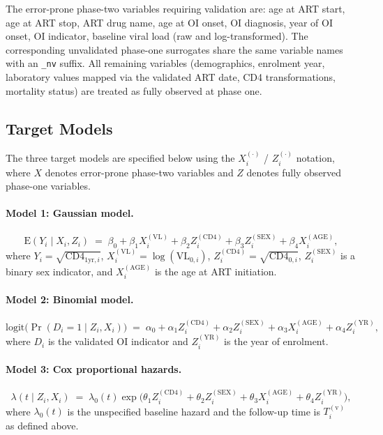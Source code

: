 The error-prone phase-two variables requiring validation are: age at ART start, age at ART stop, ART drug name, age at OI onset, OI diagnosis, year of OI onset, OI indicator, baseline viral load (raw and log-transformed). The corresponding unvalidated phase-one surrogates share the same variable names with an \texttt{\_nv} suffix. All remaining variables (demographics, enrolment year, laboratory values mapped via the validated ART date, CD4 transformations, mortality status) are treated as fully observed at phase one.

\subsection{Target Models}
\label{app:vccc_models}

The three target models are specified below using the $X_i^{(\cdot)}$ / $Z_i^{(\cdot)}$ notation, where $X$ denotes error-prone phase-two variables and $Z$ denotes fully observed phase-one variables.

\paragraph{Model 1: Gaussian model.}
\begin{equation}
    \mathrm{E}(Y_i \mid X_i, Z_i) \;=\;
    \beta_0
    + \beta_1 X_i^{(\mathrm{VL})}
    + \beta_2 Z_i^{(\mathrm{CD4})}
    + \beta_3 Z_i^{(\mathrm{SEX})}
    + \beta_4 X_i^{(\mathrm{AGE})},
    \label{eq:app_vccc_gauss}
\end{equation}
where $Y_i = \sqrt{\mathrm{CD4}_{1\mathrm{yr},i}}$, $X_i^{(\mathrm{VL})} = \log(\mathrm{VL}_{0,i})$, $Z_i^{(\mathrm{CD4})} = \sqrt{\mathrm{CD4}_{0,i}}$, $Z_i^{(\mathrm{SEX})}$ is a binary sex indicator, and $X_i^{(\mathrm{AGE})}$ is the age at ART initiation.

\paragraph{Model 2: Binomial model.}
\begin{equation}
    \mathrm{logit}\bigl(\Pr(D_i = 1 \mid Z_i, X_i)\bigr) \;=\;
    \alpha_0
    + \alpha_1 Z_i^{(\mathrm{CD4})}
    + \alpha_2 Z_i^{(\mathrm{SEX})}
    + \alpha_3 X_i^{(\mathrm{AGE})}
    + \alpha_4 Z_i^{(\mathrm{YR})},
    \label{eq:app_vccc_binom}
\end{equation}
where $D_i$ is the validated OI indicator and $Z_i^{(\mathrm{YR})}$ is the year of enrolment.

\paragraph{Model 3: Cox proportional hazards.}
\begin{equation}
    \lambda(t \mid Z_i, X_i) \;=\;
    \lambda_0(t) \exp\!\bigl(
        \theta_1 Z_i^{(\mathrm{CD4})}
      + \theta_2 Z_i^{(\mathrm{SEX})}
      + \theta_3 X_i^{(\mathrm{AGE})}
      + \theta_4 Z_i^{(\mathrm{YR})}
    \bigr),
    \label{eq:app_vccc_cox}
\end{equation}
where $\lambda_0(t)$ is the unspecified baseline hazard and the follow-up time is $T_i^{(\mathrm{v})}$ as defined above.


